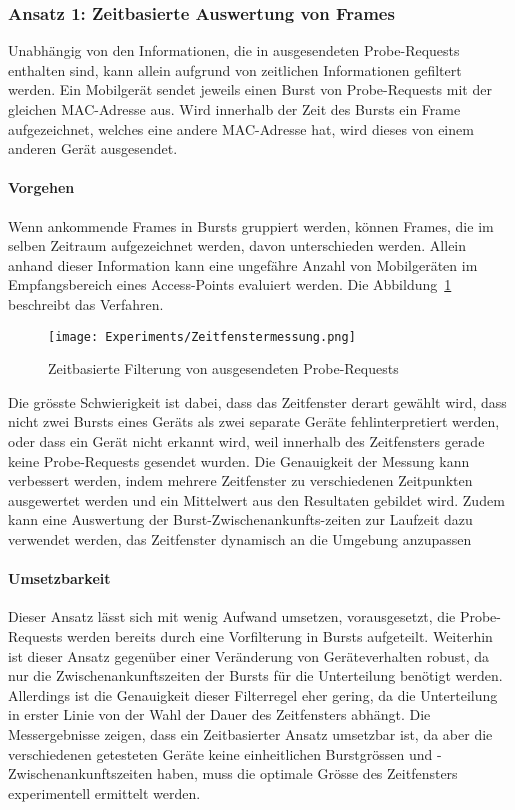 \subsubsection*{Ansatz 1: Zeitbasierte Auswertung von Frames}
Unabhängig von den Informationen, die in ausgesendeten Probe-Requests enthalten
sind, kann allein aufgrund von zeitlichen Informationen gefiltert werden.
Ein Mobilgerät sendet jeweils einen Burst von Probe-Requests mit der gleichen 
MAC-Adresse aus. Wird innerhalb der Zeit des Bursts ein Frame aufgezeichnet, 
welches eine andere MAC-Adresse hat, wird dieses von einem anderen Gerät 
ausgesendet. 

\paragraph{Vorgehen}
Wenn ankommende Frames in Bursts gruppiert werden, können Frames, die im selben 
Zeitraum aufgezeichnet werden, davon unterschieden werden. 
Allein anhand dieser Information kann eine ungefähre Anzahl von Mobilgeräten 
im Empfangsbereich eines Access-Points evaluiert werden.
Die Abbildung~\ref{figure:timewindowfiltering} beschreibt das Verfahren.

\begin{figure}[h!]
    \centering
    \texttt{[image: Experiments/Zeitfenstermessung.png]}
    \caption{Zeitbasierte Filterung von ausgesendeten Probe-Requests
    \label{figure:timewindowfiltering}}
\end{figure}

\clearpage 

Die grösste Schwierigkeit ist dabei, dass das Zeitfenster derart gewählt wird,
dass nicht zwei Bursts eines Geräts als zwei separate Geräte fehlinterpretiert 
werden, oder dass ein Gerät nicht erkannt wird, weil innerhalb des Zeitfensters 
gerade keine Probe-Requests gesendet wurden.
Die Genauigkeit der Messung kann verbessert werden, 
indem mehrere Zeitfenster zu verschiedenen Zeitpunkten ausgewertet werden 
und ein Mittelwert aus den Resultaten gebildet wird.
Zudem kann eine Auswertung der Burst-Zwischenankunfts-zeiten zur Laufzeit 
dazu verwendet werden, das Zeitfenster dynamisch an die Umgebung anzupassen

\paragraph{Umsetzbarkeit}
Dieser Ansatz lässt sich mit wenig Aufwand umsetzen, vorausgesetzt, die 
Probe-Requests werden bereits durch eine Vorfilterung in Bursts aufgeteilt.
Weiterhin ist dieser Ansatz gegenüber einer Veränderung von Geräteverhalten 
robust, da nur die Zwischenankunftszeiten der Bursts für die Unterteilung
benötigt werden.
Allerdings ist die Genauigkeit dieser Filterregel eher gering, da die 
Unterteilung in erster Linie von der Wahl der Dauer des Zeitfensters abhängt. 
Die Messergebnisse zeigen, dass ein Zeitbasierter Ansatz umsetzbar ist, 
da aber die verschiedenen getesteten Geräte keine einheitlichen 
Burstgrössen und -Zwischenankunftszeiten haben, muss die optimale Grösse des 
Zeitfensters experimentell ermittelt werden.

